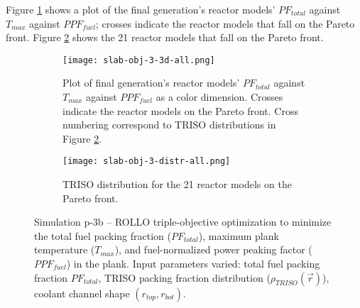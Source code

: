 Figure \ref{fig:slab-obj-3-3d-all} shows a plot of the final generation's reactor 
models' $PF_{total}$ against $T_{max}$ against $PPF_{fuel}$; 
crosses indicate the reactor models that fall on the Pareto front.
Figure \ref{fig:slab-obj-3-distr-all} shows the 21 reactor models that fall on the
Pareto front. 
\begin{figure}[htbp!]
    \begin{subfigure}{\textwidth}
        \centering
        \texttt{[image: slab-obj-3-3d-all.png]}
        \caption{Plot of final generation's reactor models' $PF_{total}$ against 
        $T_{max}$ against $PPF_{fuel}$ as a color dimension. 
        Crosses indicate the reactor models on the 
        Pareto front. Cross numbering correspond to TRISO distributions in Figure 
        \ref{fig:slab-obj-3-distr-all}.}
        \label{fig:slab-obj-3-3d-all} 
    \end{subfigure}
    \begin{subfigure}{\textwidth}
        \texttt{[image: slab-obj-3-distr-all.png]}
        \caption{TRISO distribution for the 21 reactor models on the Pareto front.}
        \label{fig:slab-obj-3-distr-all} 
    \end{subfigure}
    \caption{Simulation p-3b -- ROLLO triple-objective optimization to minimize the total 
    fuel packing fraction ($PF_{total}$), maximum plank temperature ($T_{max}$), and 
    fuel-normalized power peaking factor ($PPF_{fuel}$) in the plank. 
    Input parameters varied: total fuel packing fraction $PF_{total}$, 
    TRISO packing fraction distribution ($\rho_{TRISO}(\vec{r})$), 
    coolant channel shape $(r_{top}, r_{bot})$.}
    \label{fig:slab-obj-3-all}
\end{figure}

